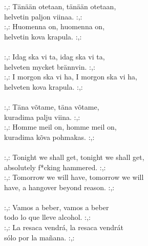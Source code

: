 
            :,: Tänään otetaan, tänään otetaan, \\
            helvetin paljon viinaa. :,: \\
            :,: Huomenna on, huomenna on, \\
            helvetin kova krapula. :,: \\
\hspace{10mm} \\
            :,: Idag ska vi ta, idag ska vi ta, \\
            helveten mycket brännvin. :,: \\
            :,: I morgon ska vi ha, I morgon ska vi ha, \\
            helveten kova krapula. :,: \\
\hspace{10mm} \\
            :,: Täna võtame, täna võtame, \\
            kuradima palju viina. :,: \\
            :,: Homme meil on, homme meil on, \\
            kuradima kõva pohmakas. :,: \\
\hspace{10mm} \\
            :,: Tonight we shall get, tonight we shall get, \\
            absolutely f*cking hammered. :,: \\
            :,: Tomorrow we will have, tomorrow we will \\
            have, a hangover beyond reason. :,: \\
\hspace{10mm} \\
            :,: Vamos a beber, vamos a beber \\
            todo lo que lleve alcohol. :,: \\
            :,: La resaca vendrá, la resaca vendrát \\
            sólo por la mañana. :,: \\
